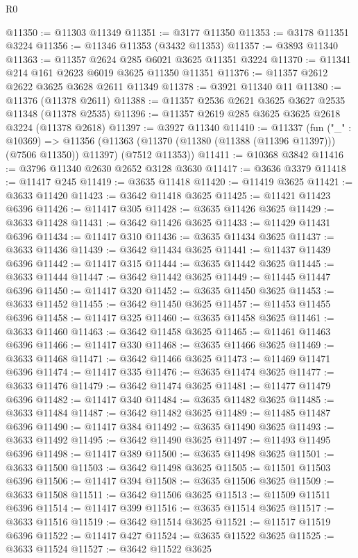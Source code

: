\begin{lexlean}{R0}
\begin{coremodule}
@11350 := @11303 @11349
@11351 := @3177 @11350
@11353 := @3178 @11351 @3224
@11356 := @11346 @11353 (@3432 @11353)
@11357 := @3893 @11340
@11363 := @11357 @2624 @285 @6021 @3625 @11351 @3224
@11370 := @11341 @214 @161 @2623 @6019 @3625 @11350 @11351
@11376 := @11357 @2612 @2622 @3625 @3628 @2611 @11349
@11378 := @3921 @11340 @11
@11380 := @11376 (@11378 @2611)
@11388 := @11357 @2536 @2621 @3625 @3627 @2535 @11348 (@11378 @2535)
@11396 := @11357 @2619 @285 @3625 @3625 @2618 @3224 (@11378 @2618)
@11397 := @3927 @11340
@11410 := @11337
    (fun ("_" : @10369) =>
    @11356 (@11363 (@11370 (@11380 (@11388 (@11396 @11397))) (@7506 @11350)) @11397) (@7512 @11353))
@11411 := @10368 @3842
@11416 := @3796 @11340 @2630 @2652 @3128 @3630
@11417 := @3636 @3379
@11418 := @11417 @245
@11419 := @3635 @11418
@11420 := @11419 @3625
@11421 := @3633 @11420
@11423 := @3642 @11418 @3625
@11425 := @11421 @11423 @6396
@11426 := @11417 @305
@11428 := @3635 @11426 @3625
@11429 := @3633 @11428
@11431 := @3642 @11426 @3625
@11433 := @11429 @11431 @6396
@11434 := @11417 @310
@11436 := @3635 @11434 @3625
@11437 := @3633 @11436
@11439 := @3642 @11434 @3625
@11441 := @11437 @11439 @6396
@11442 := @11417 @315
@11444 := @3635 @11442 @3625
@11445 := @3633 @11444
@11447 := @3642 @11442 @3625
@11449 := @11445 @11447 @6396
@11450 := @11417 @320
@11452 := @3635 @11450 @3625
@11453 := @3633 @11452
@11455 := @3642 @11450 @3625
@11457 := @11453 @11455 @6396
@11458 := @11417 @325
@11460 := @3635 @11458 @3625
@11461 := @3633 @11460
@11463 := @3642 @11458 @3625
@11465 := @11461 @11463 @6396
@11466 := @11417 @330
@11468 := @3635 @11466 @3625
@11469 := @3633 @11468
@11471 := @3642 @11466 @3625
@11473 := @11469 @11471 @6396
@11474 := @11417 @335
@11476 := @3635 @11474 @3625
@11477 := @3633 @11476
@11479 := @3642 @11474 @3625
@11481 := @11477 @11479 @6396
@11482 := @11417 @340
@11484 := @3635 @11482 @3625
@11485 := @3633 @11484
@11487 := @3642 @11482 @3625
@11489 := @11485 @11487 @6396
@11490 := @11417 @384
@11492 := @3635 @11490 @3625
@11493 := @3633 @11492
@11495 := @3642 @11490 @3625
@11497 := @11493 @11495 @6396
@11498 := @11417 @389
@11500 := @3635 @11498 @3625
@11501 := @3633 @11500
@11503 := @3642 @11498 @3625
@11505 := @11501 @11503 @6396
@11506 := @11417 @394
@11508 := @3635 @11506 @3625
@11509 := @3633 @11508
@11511 := @3642 @11506 @3625
@11513 := @11509 @11511 @6396
@11514 := @11417 @399
@11516 := @3635 @11514 @3625
@11517 := @3633 @11516
@11519 := @3642 @11514 @3625
@11521 := @11517 @11519 @6396
@11522 := @11417 @427
@11524 := @3635 @11522 @3625
@11525 := @3633 @11524
@11527 := @3642 @11522 @3625

\end{coremodule}
\end{lexlean}
